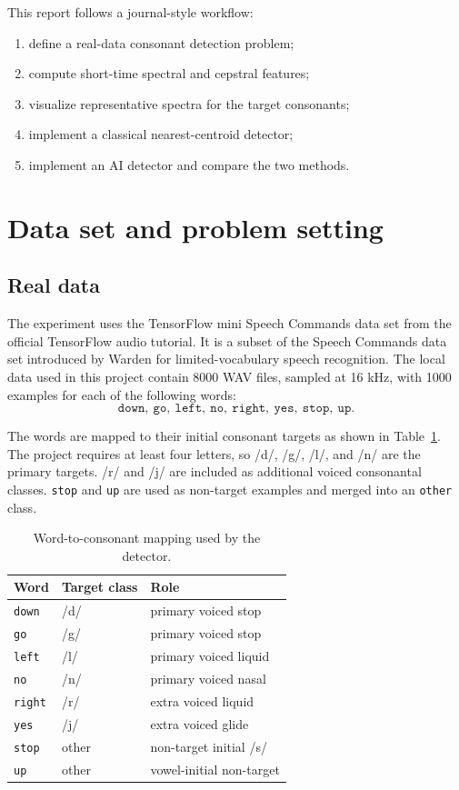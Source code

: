 \documentclass[11pt]{article}
\newcommand{\code}[1]{\texttt{#1}}
\begin{document}
This report follows a journal-style workflow:
\begin{enumerate}[nosep]
    \item define a real-data consonant detection problem;
    \item compute short-time spectral and cepstral features;
    \item visualize representative spectra for the target consonants;
    \item implement a classical nearest-centroid detector;
    \item implement an AI detector and compare the two methods.
\end{enumerate}

\section{Data set and problem setting}

\subsection{Real data}

The experiment uses the TensorFlow mini Speech Commands data set from the official TensorFlow audio tutorial.  It is a subset of the Speech Commands data set introduced by Warden for limited-vocabulary speech recognition.  The local data used in this project contain 8000 WAV files, sampled at 16 kHz, with 1000 examples for each of the following words:
\[
\texttt{down},\ \texttt{go},\ \texttt{left},\ \texttt{no},\ \texttt{right},\ \texttt{yes},\ \texttt{stop},\ \texttt{up}.
\]

The words are mapped to their initial consonant targets as shown in Table~\ref{tab:mapping}.  The project requires at least four letters, so /d/, /g/, /l/, and /n/ are the primary targets.  /r/ and /j/ are included as additional voiced consonantal classes.  \texttt{stop} and \texttt{up} are used as non-target examples and merged into an \code{other} class.

\begin{table}[H]
\centering
\caption{Word-to-consonant mapping used by the detector.}
\label{tab:mapping}
\begin{tabular}{@{}lll@{}}
\toprule
Word & Target class & Role \\
\midrule
\texttt{down} & /d/ & primary voiced stop \\
\texttt{go} & /g/ & primary voiced stop \\
\texttt{left} & /l/ & primary voiced liquid \\
\texttt{no} & /n/ & primary voiced nasal \\
\texttt{right} & /r/ & extra voiced liquid \\
\texttt{yes} & /j/ & extra voiced glide \\
\texttt{stop} & other & non-target initial /s/ \\
\texttt{up} & other & vowel-initial non-target \\
\bottomrule
\end{tabular}
\end{table}
\end{document}
